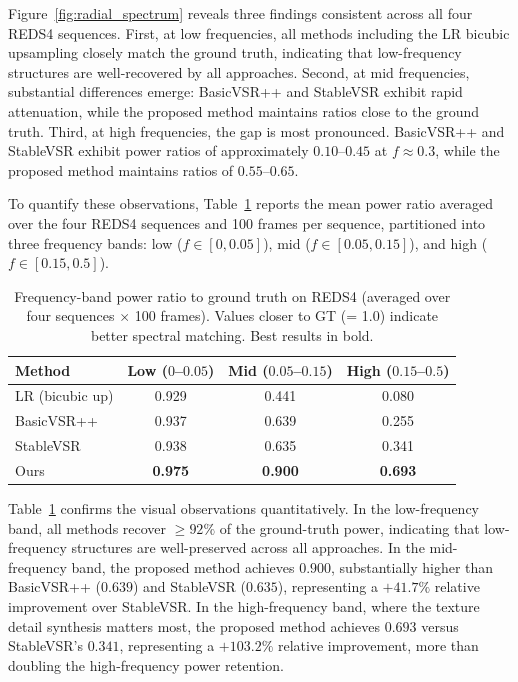 Figure~\ref{fig:radial_spectrum} reveals three findings 
consistent across all four REDS4 sequences. First, at low 
frequencies, all methods including the LR bicubic upsampling 
closely match the ground truth, indicating that low-frequency 
structures are well-recovered by all approaches. Second, at 
mid frequencies, substantial differences emerge: BasicVSR++ 
and StableVSR exhibit rapid attenuation, while the proposed 
method maintains ratios close to the ground truth. Third, at 
high frequencies, the gap is most pronounced. BasicVSR++ and 
StableVSR exhibit power ratios of approximately $0.10$--$0.45$ 
at $f \approx 0.3$, while the proposed method maintains 
ratios of $0.55$--$0.65$.

To quantify these observations, Table~\ref{tab:freq_band} 
reports the mean power ratio averaged over the four REDS4 
sequences and 100 frames per sequence, partitioned into three 
frequency bands: low ($f \in [0, 0.05]$), mid 
($f \in [0.05, 0.15]$), and high ($f \in [0.15, 0.5]$).

\begin{table}[h]
\centering
\caption{Frequency-band power ratio to ground truth on REDS4 
(averaged over four sequences $\times$ 100 frames). Values 
closer to GT (= 1.0) indicate better spectral matching. 
Best results in bold.}
\label{tab:freq_band}
\begin{tabular}{|l|c|c|c|}
\hline
Method & Low ($0$--$0.05$) & Mid ($0.05$--$0.15$) & 
High ($0.15$--$0.5$) \\
\hline\hline
LR (bicubic up) & 0.929 & 0.441 & 0.080 \\
BasicVSR++ \cite{chan2022basicvsrplusplus} & 0.937 & 0.639 & 0.255 \\
StableVSR \cite{rota2024stablevsr} & 0.938 & 0.635 & 0.341 \\
Ours & \textbf{0.975} & \textbf{0.900} & \textbf{0.693} \\
\hline
\end{tabular}
\end{table}

Table~\ref{tab:freq_band} confirms the visual observations 
quantitatively. In the low-frequency band, all methods 
recover $\geq 92\%$ of the ground-truth power, indicating 
that low-frequency structures are well-preserved across all 
approaches. In the mid-frequency band, the proposed method 
achieves $0.900$, substantially higher than BasicVSR++ 
($0.639$) and StableVSR ($0.635$), representing a $+41.7\%$ 
relative improvement over StableVSR. In the high-frequency 
band, where the texture detail synthesis matters most, the 
proposed method achieves $0.693$ versus StableVSR's $0.341$, 
representing a $+103.2\%$ relative improvement, more than 
doubling the high-frequency power retention.


